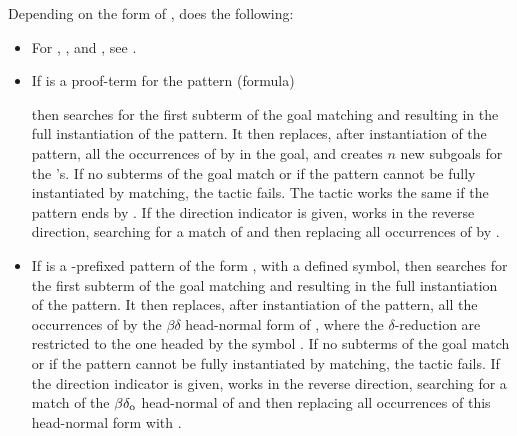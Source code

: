 Depending on the form of , \tacname{}  does the following:
  \begin{itemize}
   \item For \ec{//}, \ec{/=}, and \ec{//=}, see .
   \item If  is a proof-term for the pattern (formula)
     \begin{center}
     \end{center}
     \noindent then \tacname{} searches for the first subterm of the goal
     matching  and resulting in the full instantiation of the pattern.
     It then replaces, after instantiation of the pattern, all the occurrences
     of  by  in the goal, and creates $n$ new subgoals for the
     's. If no subterms of the goal match  or if the pattern
     cannot be fully instantiated by matching, the tactic fails.
     The tactic works the same if the pattern ends by . If the
     direction indicator \ec{-} is given, \tacname{} works in the reverse
     direction, searching for a match of  and then replacing all
     occurrences of  by .
   \item If  is a \ec{/}-prefixed pattern of the form ,
     with  a defined symbol, then \tacname{} searches for the first subterm
     of the goal matching  and resulting in the full instantiation
     of the pattern. It then replaces, after instantiation of the pattern, all
     the occurrences of  by the $\beta\delta$ head-normal form
     of , where the $\delta$-reduction are restricted to the one
     headed by the symbol . If no subterms of the goal match  or
     if the pattern cannot be fully instantiated by matching, the tactic fails. If the
     direction indicator \ec{-} is given, \tacname{} works in the reverse
     direction, searching for a match of the $\beta\delta_{\rm o}$ head-normal
     of  and then replacing all occurrences of this head-normal
     form with .
  \end{itemize}
  
